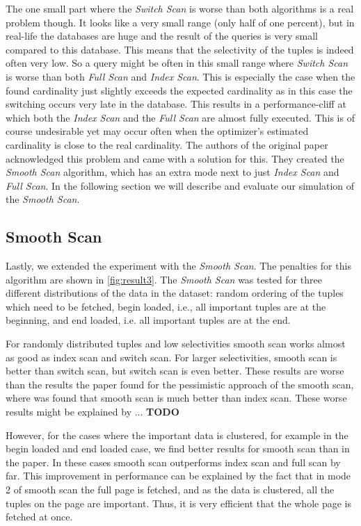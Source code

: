 \documentclass[a4paper,11pt,twoside]{article}
\begin{document}
The one small part where the \textit{Switch Scan} is worse than both algorithms is a real problem though. It looks like a very small range (only half of one percent), but in real-life the databases are huge and the result of the queries is very small compared to this database. This means that the selectivity of the tuples is indeed often very low. So a query might be often in this small range where \textit{Switch Scan} is worse than both \textit{Full Scan} and \textit{Index Scan}. This is especially the case when the found cardinality just slightly exceeds the expected cardinality as in this case the switching occurs very late in the database. This results in a performance-cliff at which both the \textit{Index Scan} and the \textit{Full Scan} are almost fully executed. This is of course undesirable yet may occur often when the optimizer's estimated cardinality is close to the real cardinality. The authors of the original paper acknowledged this problem and came with a solution for this. They created the \textit{Smooth Scan} algorithm, which has an extra mode next to just \textit{Index Scan} and \textit{Full Scan}. In the following section we will describe and evaluate our simulation of the \textit{Smooth Scan}.

\subsection{Smooth Scan}
Lastly, we extended the experiment with the \textit{Smooth Scan}. The penalties for this algorithm are shown in \autoref{fig:result3}. The \textit{Smooth Scan} was tested for three different distributions of the data in the dataset: random ordering of the tuples which need to be fetched, begin loaded, i.e., all important tuples are  at the beginning, and end loaded, i.e. all important tuples are at the end.

For randomly distributed tuples and low selectivities smooth scan works almost as good as index scan and switch scan. For larger selectivities, smooth scan is better than switch scan, but switch scan is even better. These results are worse than the results the paper found for the pessimistic approach of the smooth scan, where was found that smooth scan is much better than index scan. These worse results might be explained by ... \textbf{TODO}

However, for the cases where the important data is clustered, for example in the begin loaded and end loaded case, we find better results for smooth scan than in the paper. In these cases smooth scan outperforms index scan and full scan by far. This improvement in performance can be explained by the fact that in mode 2 of smooth scan the full page is fetched, and as the data is clustered, all the tuples on the page are important. Thus, it is very efficient that the whole page is fetched at once. 
\end{document}
